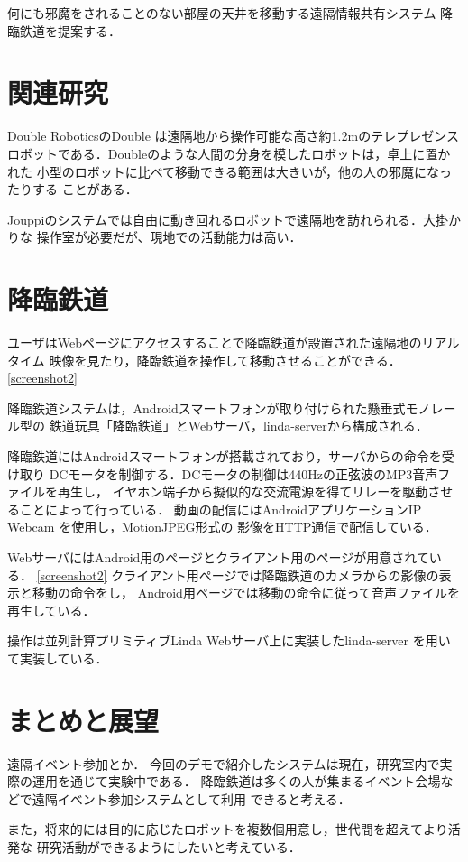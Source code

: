 \documentclass[submit,techreq]{ipsj}
\begin{document}
何にも邪魔をされることのない部屋の天井を移動する遠隔情報共有システム
降臨鉄道を提案する．

\section{関連研究}

Double RoboticsのDouble
は遠隔地から操作可能な高さ約1.2mのテレプレゼンス
ロボットである．Doubleのような人間の分身を模したロボットは，卓上に置かれた
小型のロボットに比べて移動できる範囲は大きいが，他の人の邪魔になったりする
ことがある．

Jouppiのシステム\cite{Jouppi:2002:FST:587078.587128}では自由に動き回れるロボットで遠隔地を訪れられる．大掛かりな
操作室が必要だが、現地での活動能力は高い．

\section{降臨鉄道}

ユーザはWebページにアクセスすることで降臨鉄道が設置された遠隔地のリアルタイム
映像を見たり，降臨鉄道を操作して移動させることができる．
\ref{screenshot2}

降臨鉄道システムは，Androidスマートフォンが取り付けられた懸垂式モノレール型の
鉄道玩具「降臨鉄道」とWebサーバ，linda-serverから構成される．

降臨鉄道にはAndroidスマートフォンが搭載されており，サーバからの命令を受け取り
DCモータを制御する．DCモータの制御は440Hzの正弦波のMP3音声ファイルを再生し，
イヤホン端子から擬似的な交流電源を得てリレーを駆動させることによって行っている．
動画の配信にはAndroidアプリケーションIP Webcam
を使用し，MotionJPEG形式の
影像をHTTP通信で配信している．

WebサーバにはAndroid用のページとクライアント用のページが用意されている．
\ref{screenshot2}
クライアント用ページでは降臨鉄道のカメラからの影像の表示と移動の命令をし，
Android用ページでは移動の命令に従って音声ファイルを再生している．

操作は並列計算プリミティブLinda\cite{Carriero:1989:LC:63334.63337}
Webサーバ上に実装したlinda-server
を用いて実装している．

\section{まとめと展望}

遠隔イベント参加とか．
今回のデモで紹介したシステムは現在，研究室内で実際の運用を通じて実験中である．
降臨鉄道は多くの人が集まるイベント会場などで遠隔イベント参加システムとして利用
できると考える．

また，将来的には目的に応じたロボットを複数個用意し，世代間を超えてより活発な
研究活動ができるようにしたいと考えている．




\end{document}

